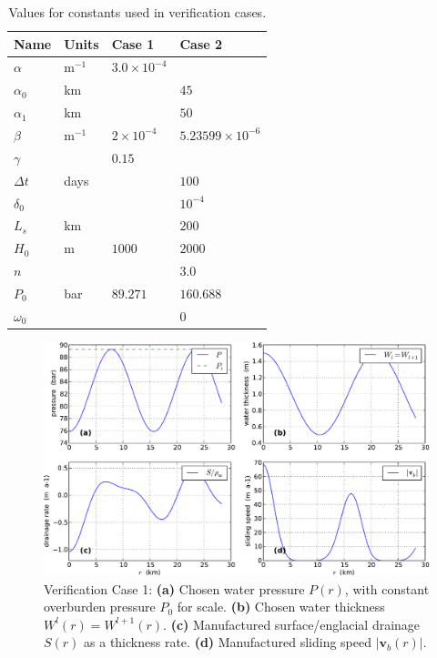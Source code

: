 \documentclass[11pt]{amsart}
\newcommand{\bv}{\mathbf{v}}
\begin{document}
\begin{table}[ht]
  \centering
  \caption{Values for constants used in verification cases.}
  \begin{tabular}{llll} 
    \textbf{Name} & \textbf{Units} & \textbf{Case 1} & \textbf{Case 2} \\
    \hline
    $\alpha$ & $\text{m}^{-1}$ & $3.0 \times 10^{-4}$ &  \\
    $\alpha_0$ & km &  & $45$ \\
    $\alpha_1$ & km &  & $50$ \\
    $\beta$ & $\text{m}^{-1}$ & $2\times 10^{-4}$ & $5.23599 \times 10^{-6}$ \\
    $\gamma$ & & $0.15$ &  \\
    $\Delta t$ & days &  & $100$ \\
    $\delta_0$ & & & $10^{-4}$ \\
    $L_s$ & km &  & $200$ \\
    $H_0$ & m & $1000$ & $2000$ \\
    $n$ &  &  & 3.0 \\
    $P_0$ & bar & $89.271$ & $160.688$ \\
    $\omega_0$ & & & $0$ \\
    \hline
  \end{tabular}
 \label{tab:verifconstants}
\end{table}

\begin{figure}[ht]
\centering
\includegraphics[width=6.2in,keepaspectratio=true]{figs/verifcase1}
\caption{Verification Case 1:  \textbf{(a)} Chosen water pressure $P(r)$, with constant overburden pressure $P_0$ for scale.  \textbf{(b)} Chosen water thickness $W^l(r)=W^{l+1}(r)$.  \textbf{(c)} Manufactured surface/englacial drainage $S(r)$ as a thickness rate.  \textbf{(d)} Manufactured sliding speed $|\bv_b(r)|$.}
\label{fig:verifcase1}
\end{figure}
\end{document}
